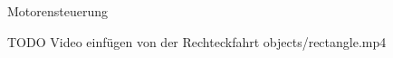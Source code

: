 \documentclass[12pt,twoside]{report}
\begin{document}
\begin{section}{Motorensteuerung}

    TODO Video einfügen von der Rechteckfahrt objects/rectangle.mp4

\end{section}
\end{document}
